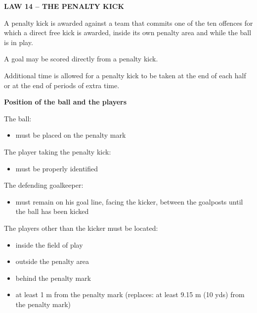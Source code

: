 \clearpage
\sffamily
{\bfseries 
\textcolor[rgb]{0.4,0.4,0.4}{LAW 14 -- THE PENALTY KICK} }

\bigskip

A penalty kick is awarded against a team that commits one of the ten
offences for which a direct free kick is awarded, inside its own
penalty area and while the ball is in play.

\bigskip

A goal may be scored directly from a penalty kick.

\bigskip

Additional time is allowed for a penalty kick to be taken at the end of
each half or at the end of periods of extra time.

\bigskip

{\bfseries Position of the ball and the players }

\headlinebox

The ball:

\begin{itemize}
\item must be placed on the penalty mark
\end{itemize}

\bigskip

The player taking the penalty kick:

\begin{itemize}
\item must be properly identified
\end{itemize}

\bigskip

The defending goalkeeper:

\begin{itemize}
\item must remain on his goal line, facing the kicker, between the goalposts
until the ball has been kicked 
\end{itemize}

\bigskip

The players other than the kicker must be located:

\begin{itemize}
\item inside the field of play
\item outside the penalty area
\item behind the penalty mark
\item at least 1 m from the penalty mark
{\color[rgb]{0.4,0.4,0.4}(replaces: at least 9.15 m (10 yds) from
the penalty mark)}
\end{itemize}

